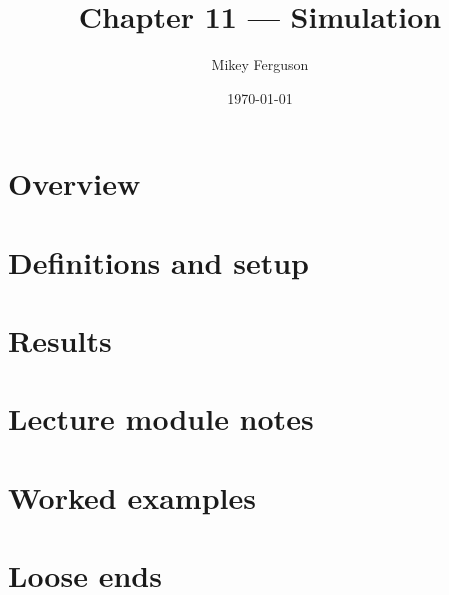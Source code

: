 \documentclass[11pt]{article}
\title{Chapter 11 --- Simulation}
\author{Mikey Ferguson}
\date{\today}
\begin{document}
\maketitle
\tableofcontents
\bigskip

\section{Overview}

\section{Definitions and setup}

\section{Results}

\section{Lecture module notes}

\section{Worked examples}

\section{Loose ends}
\end{document}
